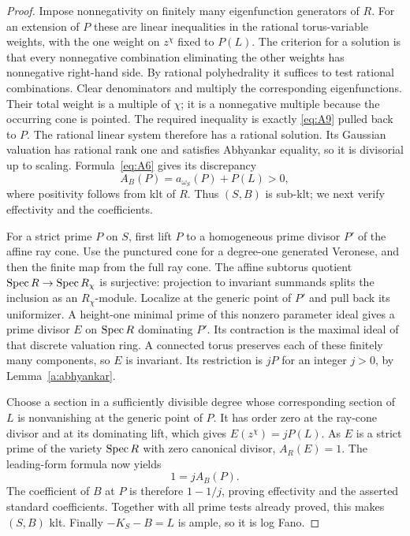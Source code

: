 \begin{proof}
Impose nonnegativity on finitely many eigenfunction generators of \(R\).
For an extension of \(P\) these are linear inequalities in the rational
torus-variable weights, with the one weight on \(z^\chi\) fixed to
\(P(L)\). The criterion for a solution is that every nonnegative
combination eliminating the other weights has nonnegative right-hand
side. By rational polyhedrality it suffices to test rational
combinations. Clear denominators and multiply the corresponding
eigenfunctions. Their total weight is a multiple of \(\chi\); it is a
nonnegative multiple because the occurring cone is pointed. The required
inequality is exactly \eqref{eq:A9} pulled back to \(P\). The rational
linear system therefore has a rational solution. Its Gaussian valuation
has rational rank one and satisfies Abhyankar equality, so it is
divisorial up to scaling. Formula~\eqref{eq:A6} gives its discrepancy
\[
                  A_B(P)=a_{\omega_S}(P)+P(L)>0,
\]
where positivity follows from klt of \(R\). Thus \((S,B)\) is sub-klt;
we next verify effectivity and the coefficients.

For a strict prime \(P\) on \(S\), first lift \(P\) to a homogeneous
prime divisor \(P'\) of the affine ray cone. Use the punctured cone for
a degree-one generated Veronese, and then the finite map from the full
ray cone. The affine subtorus quotient \(\operatorname{Spec} R\to\operatorname{Spec} R_\chi\) is
surjective: projection to invariant summands splits the inclusion as an
\(R_\chi\)-module. Localize at the generic point of \(P'\) and pull
back its uniformizer. A height-one minimal prime of this nonzero
parameter ideal gives a prime divisor \(E\) on \(\operatorname{Spec} R\) dominating
\(P'\). Its contraction is the maximal ideal of that discrete valuation
ring. A connected torus preserves each of these finitely many components,
so \(E\) is invariant. Its restriction is \(jP\) for an integer
\(j>0\), by Lemma~\ref{a:abhyankar}.

Choose a section in a sufficiently divisible degree whose corresponding
section of \(L\) is nonvanishing at the generic point of \(P\).
It has order zero at the ray-cone divisor and at its dominating lift,
which gives \(E(z^\chi)=jP(L)\). As \(E\) is a strict prime of the
variety \(\operatorname{Spec} R\) with zero canonical divisor, \(A_R(E)=1\).
The leading-form formula now yields
\[
                         1=jA_B(P).
\]
The coefficient of \(B\) at \(P\) is therefore \(1-1/j\), proving
effectivity and the asserted standard coefficients. Together with all
prime tests already proved, this makes \((S,B)\) klt. Finally
\(-K_S-B=L\) is ample, so it is log Fano.
\end{proof}

